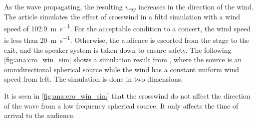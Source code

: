 As the wave propagating, the resulting $v_{ray}$ increases in the direction of the wind. The article \citep{crosswind_simulation} simulates the effect of crosswind in a \gls{fdtd} simulation with a wind speed of \SI{102.9}{\meter\per\second}. For the acceptable condition to a concert, the wind speed is less than \SI{20}{\meter\per\second}. Otherwise, the audience is escorted from the stage to the exit, and the speaker system is taken down to ensure safety. The following \autoref{fig:ana:cro_win_sim} shows a simulation result from \citep{crosswind_simulation}, where the source is an omnidirectional  spherical source while the wind has a constant uniform wind speed from left. The simulation is done in two dimensions. 




It is seen in \autoref{fig:ana:cro_win_sim} that the crosswind do not affect the direction of the wave from a low frequency spherical source. It only affects the time of arrival to the audience.





